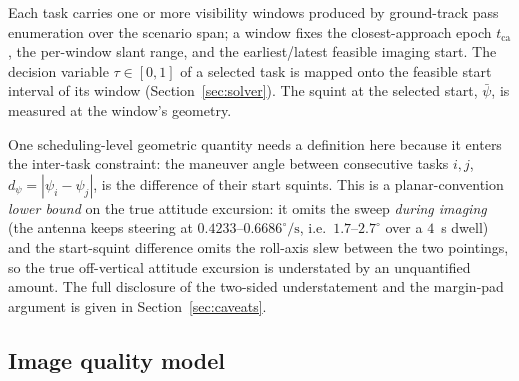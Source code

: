 \documentclass[preprint,authoryear]{elsarticle}
\begin{document}
Each task carries one or more visibility windows produced by ground-track pass enumeration over the scenario span; a window fixes the closest-approach epoch $t_{\mathrm{ca}}$, the per-window slant range, and the earliest/latest feasible imaging start. The decision variable $\tau\in[0,1]$ of a selected task is mapped onto the feasible start interval of its window (Section~\ref{sec:solver}). The squint at the selected start, $\bar\psi$, is measured at the window's geometry.

One scheduling-level geometric quantity needs a definition here because it enters the inter-task constraint: the maneuver angle between consecutive tasks $i,j$, $d_\psi=|\psi_i-\psi_j|$, is the difference of their start squints. This is a planar-convention \emph{lower bound} on the true attitude excursion: it omits the sweep \emph{during imaging} (the antenna keeps steering at $0.4233$--$0.6686^{\circ}/\mathrm{s}$, i.e.\ $1.7$--$2.7^{\circ}$ over a $4$~s dwell) and the start-squint difference omits the roll-axis slew between the two pointings, so the true off-vertical attitude excursion is understated by an unquantified amount. The full disclosure of the two-sided understatement and the margin-pad argument is given in Section~\ref{sec:caveats}.

\subsection{Image quality model}\label{sec:quality}
\end{document}
